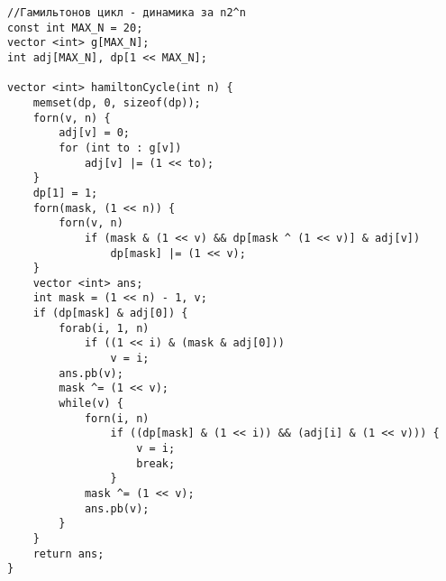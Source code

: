 \begin{verbatim}
//Гамильтонов цикл - динамика за n2^n
const int MAX_N = 20;
vector <int> g[MAX_N];
int adj[MAX_N], dp[1 << MAX_N];

vector <int> hamiltonCycle(int n) {
	memset(dp, 0, sizeof(dp));
	forn(v, n) {
		adj[v] = 0;
		for (int to : g[v])
			adj[v] |= (1 << to);
	}
	dp[1] = 1;
	forn(mask, (1 << n)) {
		forn(v, n)
			if (mask & (1 << v) && dp[mask ^ (1 << v)] & adj[v])
				dp[mask] |= (1 << v);
	}
	vector <int> ans;
	int mask = (1 << n) - 1, v; 
	if (dp[mask] & adj[0]) {
		forab(i, 1, n)
			if ((1 << i) & (mask & adj[0]))
				v = i;
		ans.pb(v);
		mask ^= (1 << v);
		while(v) {
			forn(i, n)
				if ((dp[mask] & (1 << i)) && (adj[i] & (1 << v))) {
					v = i;
					break;
				} 
			mask ^= (1 << v);
			ans.pb(v);
		}
	}
	return ans;
}
\end{verbatim}
